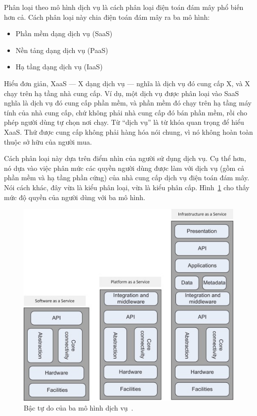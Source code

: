 \documentclass{article}
\begin{document}
Phân loại theo mô hình dịch vụ là cách phân loại điện toán đám mây phổ biến hơn
cả. Cách phân loại này chia điện toán đám mây ra ba mô hình:

\begin{itemize}
    \item Phần mềm dạng dịch vụ (SaaS)
    \item Nền tảng dạng dịch vụ (PaaS)
    \item Hạ tầng dạng dịch vụ (IaaS)
\end{itemize}

Hiểu đơn giản, XaaS --- X dạng dịch vụ --- nghĩa là dịch vụ đó cung cấp X, và X
chạy trên hạ tầng nhà cung cấp. Ví dụ, một dịch vụ được phân loại vào SaaS nghĩa
là dịch vụ đó cung cấp phần mềm, và phần mềm đó chạy trên hạ tầng máy tính của
nhà cung cấp, chứ không phải nhà cung cấp đó bán phần mềm, rồi cho phép người
dùng tự chọn nơi chạy. Từ ``dịch vụ'' là từ khóa quan trọng để hiểu XaaS. Thứ
được cung cấp không phải hàng hóa nói chung, vì nó không hoàn toàn thuộc sở hữu
của người mua.

Cách phân loại này dựa trên điểm nhìn của người sử dụng dịch vụ. Cụ thể hơn, nó
dựa vào việc phân mức các quyền người dùng được làm với dịch vụ (gồm cả phần mềm
và hạ tầng phần cứng) của nhà cung cấp dịch vụ điện toán đám mây. Nói cách khác,
đây vừa là kiểu phân loại, vừa là kiểu phân cấp. Hình~\ref{csaguidev3} cho thấy
mức độ quyền của người dùng với ba mô hình.

\begin{figure}[H]
    \includegraphics[scale=0.8]{csaguidev3.jpg}
    \centering
    \caption{Bậc tự do của ba mô hình dịch vụ~\cite{CSA2011}.}\label{csaguidev3}
\end{figure}
\end{document}
